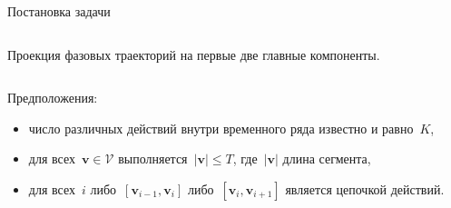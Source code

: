\documentclass[10pt,pdf,hyperref={unicode}]{beamer}
\begin{document}
\begin{frame}[shrink=5]{Постановка задачи}
\begin{center}
\begin{columns}
\begin{column}{0.55\textwidth}
			Проекция фазовых траекторий на первые две главные компоненты.
    		\end{column}
	\end{columns}
\end{center}

Предположения:
\begin{itemize}
	\item число различных действий внутри временного ряда известно и равно~$K$,
	\item для всех~$\textbf{v} \in \mathcal{V}$ выполняется~$\left|\textbf{v}\right| \leq T$, где~$\left|\textbf{v}\right|$ длина сегмента,
	\item для всех~$i$ либо~$[\textbf{v}_{i-1},\textbf{v}_{i}]$ либо~$[\textbf{v}_{i},\textbf{v}_{i+1}]$  является цепочкой действий.
\end{itemize}

\end{frame}
\end{document}
